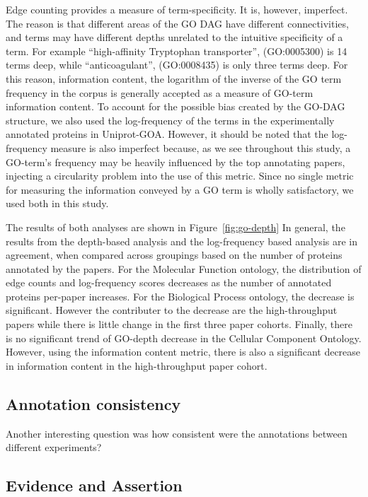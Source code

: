 \documentclass[12pt]{article}
\begin{document}
Edge counting provides a measure of term-specificity. It is, however, imperfect. The reason is
that different areas of the GO DAG have different connectivities, and terms may have different
depths unrelated to the intuitive specificity of a term. For example ``high-affinity Tryptophan
transporter'', (GO:0005300) is 14 terms deep, while ``anticoagulant'', (GO:0008435) is only three
terms deep.  For this reason, information content, the logarithm of the inverse of the GO term
frequency in the corpus is generally accepted as a measure of GO-term information
content\cite{lord-semsim}. To account for the possible bias created by the GO-DAG structure, we
also used the log-frequency of the terms in the experimentally annotated proteins in Uniprot-GOA.
However, it should be noted that the log-frequency measure is also imperfect because, as we see
throughout this study, a GO-term's frequency may be heavily influenced  by the top annotating
papers, injecting a circularity problem into the use of this metric. Since no
single metric for measuring the information conveyed by a GO term is wholly satisfactory, we used
both in this study.

The results of both analyses are shown in Figure~\ref{fig:go-depth} %
In general, the results from the depth-based analysis and the
log-frequency based analysis are in agreement, when compared across groupings based on the
number of proteins annotated by the papers. For the Molecular Function ontology, the
distribution of edge counts and log-frequency scores decreases as the number of annotated
proteins per-paper increases.  For the Biological Process ontology, the decrease is
significant. However the contributer to the decrease are the high-throughput papers
while there is little change in the first three paper cohorts.
Finally, there is no significant trend of GO-depth decrease in the Cellular Component
Ontology. However, using the information content metric, there is also a significant decrease
in information content in the high-throughput paper cohort.

\subsection*{Annotation consistency}
Another interesting question was how consistent were the annotations between different experiments?


\subsection*{Evidence and Assertion}
\end{document}
